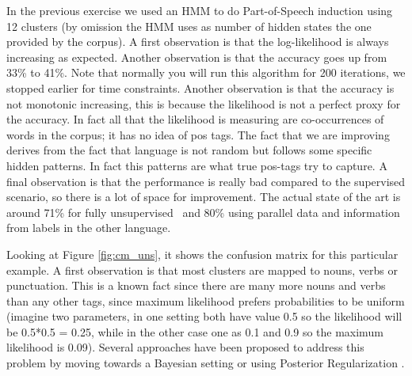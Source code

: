 In the previous exercise we used an HMM to do Part-of-Speech induction using 12 clusters (by omission the HMM uses as number of hidden states the one provided by the corpus). A first observation is that the log-likelihood is always increasing as expected. Another observation is that the accuracy goes up from 33\% to 41\%. 
Note that normally you will run this algorithm for 200 iterations, we stopped earlier for time constraints. Another observation is that the accuracy is not monotonic increasing, this is because the likelihood is not a perfect proxy for the accuracy. In fact all that the likelihood is measuring are co-occurrences of words in the corpus; it has no idea of pos tags. The fact that we are improving derives from the fact that language is not random but follows some specific hidden patterns. In fact this patterns are what true pos-tags try to capture. A final observation is that the performance is really bad compared to the supervised scenario, so there is a lot of space for improvement. The actual state of the art is around 71\% for fully unsupervised~\citep{JoaoThesis,bergkirkpatrick2010naacl} and 80\% \citep{das-petrov:2011:ACL-HLT2011} using parallel data and information from labels in the other language. 

Looking at Figure \ref{fig:cm_uns}, it shows the confusion matrix for this particular example. 
A first observation is that most clusters are mapped to nouns, verbs or punctuation. 
This is a known fact since there are many more nouns and verbs than any other tags, since maximum likelihood prefers probabilities 
to be uniform (imagine two parameters, in one setting both have value 0.5 so the likelihood will be 0.5*0.5 = 0.25, 
while in the other case one as 0.1 and 0.9 so the maximum likelihood is 0.09). Several approaches have been proposed to 
address this problem by moving towards a Bayesian setting \citep{johnson2007dtf} or using 
Posterior Regularization \citep{graca2009nips}. 









